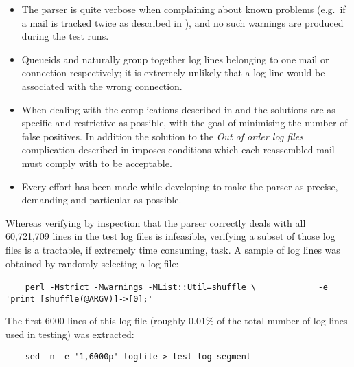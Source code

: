 \begin{itemize}

    \item The parser is quite verbose when complaining about known problems
        (e.g.\ if a mail is tracked twice as described in
        ), and no such warnings are
        produced during the test runs.

    \item Queueids and \pids{} naturally group together log lines belonging
        to one mail or connection respectively; it is extremely unlikely
        that a log line would be associated with the wrong connection.

    \item When dealing with the complications described in
         and  the solutions are as specific and restrictive as
        possible, with the goal of minimising the number of false
        positives.  In addition the solution to the \textit{Out of order
        log files\/} complication described in  imposes conditions which each reassembled mail must comply
        with to be acceptable.

    \item Every effort has been made while developing to make the parser as
        precise, demanding and particular as possible.

\end{itemize}

Whereas verifying by inspection that the parser correctly deals with all
60,721,709 lines in the test log files is infeasible, verifying a subset of
those log files is a tractable, if extremely time consuming, task.  A
sample of log lines was obtained by randomly selecting a log file:

\verb!    perl -Mstrict -Mwarnings -MList::Util=shuffle \!\newline
\verb!            -e 'print [shuffle(@ARGV)]->[0];'!

The first 6000 lines of this log file (roughly 0.01\% of the total number
of log lines used in testing) was extracted:

\verb!    sed -n -e '1,6000p' logfile > test-log-segment!

